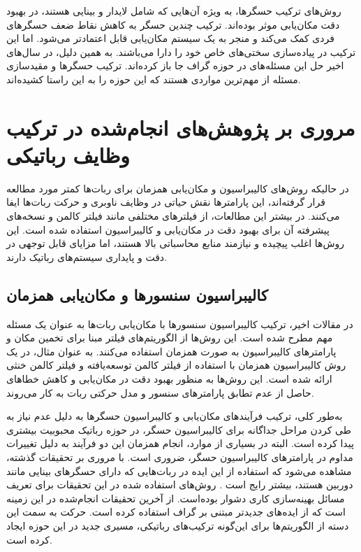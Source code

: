 روش‌های ترکیب حسگرها، به ویژه آن‌هایی که شامل لایدار و بینایی هستند، در بهبود دقت مکان‌یابی موثر بوده‌اند. ترکیب چندین حسگر به کاهش نقاط ضعف حسگرهای فردی کمک می‌کند و منجر به یک سیستم مکان‌یابی قابل اعتمادتر می‌شود. اما این ترکیب در پیاده‌سازی سختی‌های خاص خود را دارا می‌باشند. به همین دلیل، در سال‌های اخیر حل این مسئله‌های در حوزه گراف جا باز کرده‌اند. ترکیب حسگر‌ها و مقید‌سازی مسئله از مهم‌ترین مواردی هستند که این حوزه ‌را به این راستا کشیده‌اند.

\section{مروری بر پژوهش‌های انجام‌شده در ترکیب وظایف رباتیکی} 


در‌ حالیکه روش‌های کالیبراسیون و مکان‌یابی همزمان برای ربات‌ها کمتر مورد مطالعه قرار گرفته‌اند، این پارامترها نقش حیاتی در وظایف ناوبری و حرکت ربات‌ها ایفا می‌کنند. در بیشتر این مطالعات، از فیلترهای مختلفی مانند فیلتر کالمن و نسخه‌های پیشرفته آن برای بهبود دقت در مکان‌یابی و کالیبراسیون استفاده شده است. این روش‌ها اغلب پیچیده و نیازمند منابع محاسباتی بالا هستند، اما مزایای قابل توجهی در دقت و پایداری سیستم‌های رباتیک دارند.

\subsection{کالیبراسیون سنسورها و مکان‌یابی همزمان}
در مقالات اخیر، ترکیب کالیبراسیون سنسورها با مکان‌یابی ربات‌ها به عنوان یک مسئله مهم مطرح شده است. این روش‌ها از الگوریتم‌های فیلتر مبنا برای تخمین مکان و پارامترهای کالیبراسیون به صورت همزمان استفاده می‌کنند. به عنوان مثال، در \cite{kummerle2012simultaneous} یک روش کالیبراسیون همزمان با استفاده از فیلتر کالمن توسعه‌یافته و فیلتر کالمن خنثی ارائه شده است. این روش‌ها به منظور بهبود دقت در مکان‌یابی و کاهش خطاهای حاصل از عدم تطابق پارامترهای سنسور و مدل حرکتی ربات به کار می‌روند. 

به‌طور کلی، ترکیب فرآیندهای مکان‌یابی و کالیبراسیون حسگرها به دلیل عدم نیاز به طی کردن مراحل جداگانه برای کالیبراسیون حسگر، در حوزه رباتیک محبوبیت بیشتری پیدا کرده است. البته در بسیاری از موارد، انجام همزمان این دو فرآیند به دلیل تغییرات مداوم در پارامترهای کالیبراسیون حسگر، ضروری است. با مروری بر تحقیقات گذشته، مشاهده می‌شود که استفاده از این ایده در ربات‌هایی که دارای حسگرهای بینایی مانند دوربین هستند، بیشتر رایج است
\cite{zhou2014simultaneous, foxlin2002generalized}. 
روش‌های استفاده شده در این تحقیقات برای تعریف مسائل بهینه‌سازی کاری دشوار بوده‌است. 
\cite{reinke2019factor}
از آخرین تحقیقات انجام‌شده در این زمینه است که از ایده‌های جدیدتر مبتنی بر گراف استفاده کرده است. حرکت به سمت این دسته از الگوریتم‌ها برای این‌گونه ترکیب‌های رباتیکی، مسیری جدید در این حوزه ایجاد کرده است. 
  
